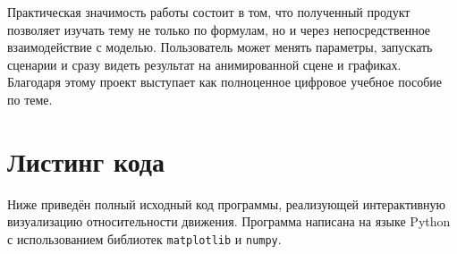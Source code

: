 \documentclass[12pt,a4paper]{article}
\begin{document}
Практическая значимость работы состоит в том, что полученный продукт позволяет изучать тему не только по формулам, но и через непосредственное взаимодействие с моделью. Пользователь может менять параметры, запускать сценарии и сразу видеть результат на анимированной сцене и графиках. Благодаря этому проект выступает как полноценное цифровое учебное пособие по теме.

\section{Листинг кода}
\label{sec:listing}

Ниже приведён полный исходный код программы, реализующей интерактивную визуализацию относительности движения. Программа написана на языке Python с использованием библиотек \texttt{matplotlib} и \texttt{numpy}.
\end{document}
